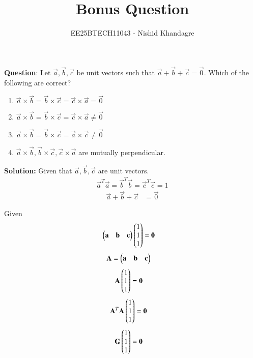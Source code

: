 \documentclass[journal]{IEEEtran}
\title{Bonus Question}
\author{EE25BTECH11043 - Nishid Khandagre} %
\begin{document}
\maketitle

\renewcommand{\thefigure}{\theenumi}
\renewcommand{\thetable}{\theenumi}



\textbf{Question}:
Let $\vec{a}, \vec{b}, \vec{c}$ be unit vectors such that $\vec{a} + \vec{b} + \vec{c} = \vec{0}$. Which of the following are correct?
\begin{enumerate}
    \item $\vec{a} \times \vec{b} = \vec{b} \times \vec{c} = \vec{c} \times \vec{a} = \vec{0}$
    \item $\vec{a} \times \vec{b} = \vec{b} \times \vec{c} = \vec{c} \times \vec{a} \neq \vec{0}$
    \item $\vec{a} \times \vec{b} = \vec{b} \times \vec{c} = \vec{a} \times \vec{c} \neq \vec{0}$
    \item $\vec{a} \times \vec{b}, \vec{b} \times \vec{c}, \vec{c} \times \vec{a}$ are mutually perpendicular.
\end{enumerate}

\textbf{Solution: }
Given that $\vec{a}, \vec{b}, \vec{c}$ are unit vectors.
\begin{align}
    \vec{a}^T \vec{a} = \vec{b}^T \vec{b} = \vec{c}^T \vec{c} = 1
\end{align}
\begin{align}
    \vec{a} + \vec{b} + \vec{c} &= \vec{0}
\end{align}


 Given 
 \begin{align}
    \begin{pmatrix}\mathbf{a} & \mathbf{b} & \mathbf{c}\end{pmatrix}\begin{pmatrix}1\\1\\1\end{pmatrix}&=\mathbf{0}
\end{align}
\begin{align}
\mathbf{A}&=\begin{pmatrix}\mathbf{a} & \mathbf{b} & \mathbf{c}\end{pmatrix}
\end{align}
\begin{align}
\mathbf{A}\begin{pmatrix}1\\1\\1\end{pmatrix}&=\mathbf{0}
\end{align}
\begin{align}
\mathbf{A}^T\mathbf{A}\begin{pmatrix}1\\1\\1\end{pmatrix}&=\mathbf{0} 
\end{align}
\begin{align}
\mathbf{G}\begin{pmatrix}1\\1\\1\end{pmatrix}&=\mathbf{0}
\end{align}
\end{document}
